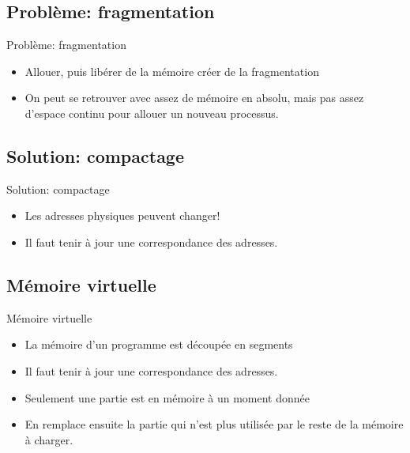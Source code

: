 \begin{frame}{\sectitle}
\def\subsectitle{Problème: fragmentation}
\subsection{\subsectitle}
\begin{block}{\subsectitle}
\begin{itemize}
    \item Allouer, puis libérer de la mémoire créer de la fragmentation
    \item On peut se retrouver avec assez de mémoire en absolu, mais pas assez
    d'espace continu pour allouer un nouveau processus.
\end{itemize}
\end{block}

\def\subsectitle{Solution: compactage}
\subsection{\subsectitle}
\begin{block}{\subsectitle}
\begin{itemize}
    \item Les adresses physiques peuvent changer!
    \item Il faut tenir à jour une correspondance des adresses.
\end{itemize}
\end{block}
\end{frame}

\begin{frame}{\sectitle}
\def\subsectitle{Mémoire virtuelle}
\subsection{\subsectitle}
\begin{block}{\subsectitle}
\begin{itemize}
    \item La mémoire d'un programme est découpée en segments 
    \item Il faut tenir à jour une correspondance des adresses.
    \item Seulement une partie est en mémoire à un moment donnée
    \item En remplace ensuite la partie qui n'est plus utilisée par le reste de
        la mémoire à charger.
\end{itemize}
\end{block}
\end{frame}

